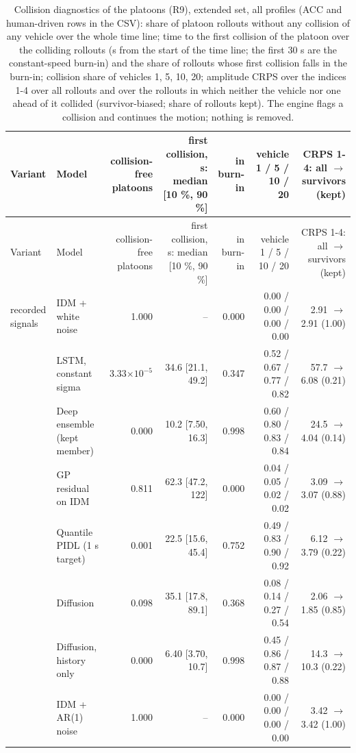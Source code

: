 \begin{longtable}{llrrrrr}
\caption{Collision diagnostics of the platoons (R9), extended set, all profiles (ACC and human-driven rows in the CSV): share of platoon rollouts without any collision of any vehicle over the whole time line; time to the first collision of the platoon over the colliding rollouts (s from the start of the time line; the first 30 s are the constant-speed burn-in) and the share of rollouts whose first collision falls in the burn-in; collision share of vehicles 1, 5, 10, 20; amplitude CRPS over the indices 1-4 over all rollouts and over the rollouts in which neither the vehicle nor one ahead of it collided (survivor-biased; share of rollouts kept). The engine flags a collision and continues the motion; nothing is removed.}\label{tab:t6-collision-diagnostics} \\
\toprule
Variant & Model & collision-free platoons & first collision, s: median [10 \%, 90 \%] & in burn-in & vehicle 1 / 5 / 10 / 20 & CRPS 1-4: all $\rightarrow$ survivors (kept) \\
\midrule
\endfirsthead
\toprule
Variant & Model & collision-free platoons & first collision, s: median [10 \%, 90 \%] & in burn-in & vehicle 1 / 5 / 10 / 20 & CRPS 1-4: all $\rightarrow$ survivors (kept) \\
\midrule
\endhead
\bottomrule
\endlastfoot
recorded signals & IDM + white noise & 1.000 & -- & 0.000 & 0.00 / 0.00 / 0.00 / 0.00 & 2.91 $\rightarrow$ 2.91 (1.00) \\
 & LSTM, constant sigma & 3.33$\times10^{-5}$ & 34.6 [21.1, 49.2] & 0.347 & 0.52 / 0.67 / 0.77 / 0.82 & 57.7 $\rightarrow$ 6.08 (0.21) \\
 & Deep ensemble (kept member) & 0.000 & 10.2 [7.50, 16.3] & 0.998 & 0.60 / 0.80 / 0.83 / 0.84 & 24.5 $\rightarrow$ 4.04 (0.14) \\
 & GP residual on IDM & 0.811 & 62.3 [47.2, 122] & 0.000 & 0.04 / 0.05 / 0.02 / 0.02 & 3.09 $\rightarrow$ 3.07 (0.88) \\
 & Quantile PIDL (1 s target) & 0.001 & 22.5 [15.6, 45.4] & 0.752 & 0.49 / 0.83 / 0.90 / 0.92 & 6.12 $\rightarrow$ 3.79 (0.22) \\
 & Diffusion & 0.098 & 35.1 [17.8, 89.1] & 0.368 & 0.08 / 0.14 / 0.27 / 0.54 & 2.06 $\rightarrow$ 1.85 (0.85) \\
 & Diffusion, history only & 0.000 & 6.40 [3.70, 10.7] & 0.998 & 0.45 / 0.86 / 0.87 / 0.88 & 14.3 $\rightarrow$ 10.3 (0.22) \\
 & IDM + AR(1) noise & 1.000 & -- & 0.000 & 0.00 / 0.00 / 0.00 / 0.00 & 3.42 $\rightarrow$ 3.42 (1.00) \\

\end{longtable}
